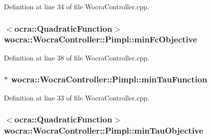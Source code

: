 Definition at line 34 of file Wocra\+Controller.\+cpp.

\subsubsection[{\texorpdfstring{min\+Fc\+Objective}{minFcObjective}}]{$<${\bf ocra\+::\+Quadratic\+Function}$>$ wocra\+::\+Wocra\+Controller\+::\+Pimpl\+::min\+Fc\+Objective}\hypertarget{structwocra_1_1WocraController_1_1Pimpl_a204f0258bde95ab0f29d1d1937cd80d2}{}\label{structwocra_1_1WocraController_1_1Pimpl_a204f0258bde95ab0f29d1d1937cd80d2}


Definition at line 38 of file Wocra\+Controller.\+cpp.

\subsubsection[{\texorpdfstring{min\+Tau\+Function}{minTauFunction}}]{$\ast$ wocra\+::\+Wocra\+Controller\+::\+Pimpl\+::min\+Tau\+Function}\hypertarget{structwocra_1_1WocraController_1_1Pimpl_a49e2adcc51cd75b3a17ebf31cf497d31}{}\label{structwocra_1_1WocraController_1_1Pimpl_a49e2adcc51cd75b3a17ebf31cf497d31}


Definition at line 33 of file Wocra\+Controller.\+cpp.

\subsubsection[{\texorpdfstring{min\+Tau\+Objective}{minTauObjective}}]{$<${\bf ocra\+::\+Quadratic\+Function}$>$ wocra\+::\+Wocra\+Controller\+::\+Pimpl\+::min\+Tau\+Objective}\hypertarget{structwocra_1_1WocraController_1_1Pimpl_a02fbd15274314a18d7518ad0bb721358}{}\label{structwocra_1_1WocraController_1_1Pimpl_a02fbd15274314a18d7518ad0bb721358}


